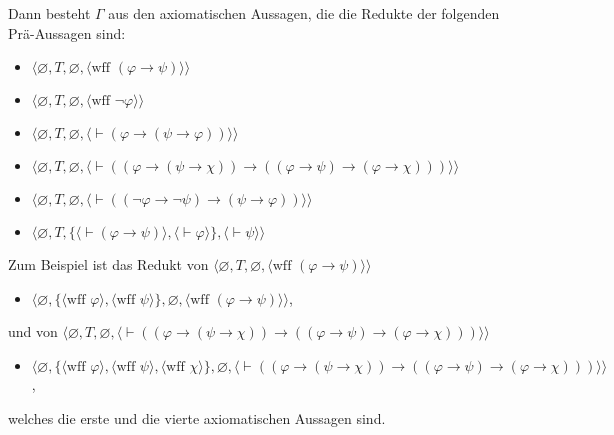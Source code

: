 \noindent Dann besteht $\Gamma$ aus den axiomatischen Aussagen, die die Redukte der folgenden Prä-Aussagen sind:
    \begin{itemize}
      \item[] $\langle\varnothing,T,\varnothing,
               \langle \mbox{wff\ }(\varphi\to\psi)\rangle\rangle$
      \item[] $\langle\varnothing,T,\varnothing,
               \langle \mbox{wff\ }\lnot\varphi\rangle\rangle$
      \item[] $\langle\varnothing,T,\varnothing,
               \langle \vdash(\varphi\to(\psi\to\varphi))
               \rangle\rangle$
      \item[] $\langle\varnothing,T,
               \varnothing,
               \langle \vdash((\varphi\to(\psi\to\chi))\to
               ((\varphi\to\psi)\to(\varphi\to\chi)))
               \rangle\rangle$
      \item[] $\langle\varnothing,T,
               \varnothing,
               \langle \vdash((\lnot\varphi\to\lnot\psi)\to
               (\psi\to\varphi))\rangle\rangle$
      \item[] $\langle\varnothing,T,
               \{\langle\vdash(\varphi\to\psi)\rangle,
                 \langle\vdash\varphi\rangle\},
               \langle\vdash\psi\rangle\rangle$
    \end{itemize}

\noindent Zum Beispiel ist das Redukt von $\langle\varnothing,T,\varnothing, \langle \mbox{wff\ }(\varphi\to\psi)\rangle\rangle$ 
\begin{itemize}
\item[] $\langle\varnothing,
\{\langle \mbox{wff\ } \varphi\rangle,
             \langle \mbox{wff\ } \psi\rangle\},
             \varnothing,
               \langle \mbox{wff\ }(\varphi\to\psi)\rangle\rangle$,
\end{itemize}

und von $\langle\varnothing,T,\varnothing,\langle \vdash((\varphi\to(\psi\to\chi))\to((\varphi\to\psi)\to(\varphi\to\chi)))
\rangle\rangle$
\begin{itemize}
\item[] $\langle\varnothing,\{\langle \mbox{wff\ } \varphi\rangle,
\langle \mbox{wff\ } \psi\rangle, \langle \mbox{wff\ } \chi\rangle\},\varnothing,\langle \vdash((\varphi\to(\psi\to\chi))\to((\varphi\to\psi)\to(\varphi\to\chi)))
\rangle\rangle$,
\end{itemize}
welches die erste und die vierte axiomatischen Aussagen sind.

